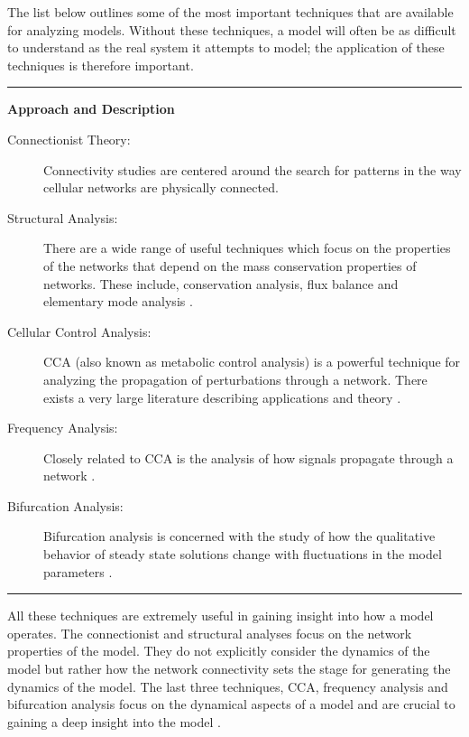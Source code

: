 \documentclass[]{article}
\begin{document}
The list below outlines some of the most important techniques that are
available for analyzing models. Without these techniques, a model will
often be as difficult to understand as the real system it attempts to
model; the application of these techniques is therefore important.

\begin{center}\rule{3in}{0.4pt}\end{center}

\textbf{Approach and Description}

\begin{description}
\item[Connectionist Theory:]
Connectivity studies are centered around the search for patterns in the
way cellular networks are physically connected.
\autocite{BarabasiReview2004}

\item[Structural Analysis:]
There are a wide range of useful techniques which focus on the
properties of the networks that depend on the mass conservation
properties of networks. These include, conservation analysis, flux
balance and elementary mode analysis \autocite{Schuster:Book}.

\item[Cellular Control Analysis:]
CCA (also known as metabolic control analysis) is a powerful technique
for analyzing the propagation of perturbations through a network. There
exists a very large literature describing applications and theory
\autocite{Fell:Book}.

\item[Frequency Analysis:]
Closely related to CCA is the analysis of how signals propagate through
a network \autocites{Ingalls2004}{RaoSauroArkin}.

\item[Bifurcation Analysis:]
Bifurcation analysis is concerned with the study of how the qualitative
behavior of steady state solutions change with fluctuations in the model
parameters \autocite{TysonNatReview2001}.

\end{description}
\begin{center}\rule{3in}{0.4pt}\end{center}

All these techniques are extremely useful in gaining insight into how a
model operates. The connectionist and structural analyses focus on the
network properties of the model. They do not explicitly consider the
dynamics of the model but rather how the network connectivity sets the
stage for generating the dynamics of the model. The last three
techniques, CCA, frequency analysis and bifurcation analysis focus on
the dynamical aspects of a model and are crucial to gaining a deep
insight into the model \autocites{Bakker:1997}{TysonNatReview2001}.
\end{document}
